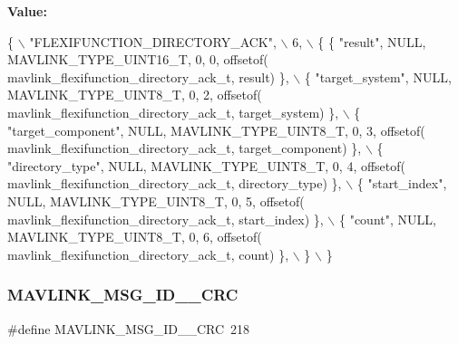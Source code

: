 {\bfseries Value\+:}
\begin{DoxyCode}
\{ \(\backslash\)
    \textcolor{stringliteral}{"FLEXIFUNCTION\_DIRECTORY\_ACK"}, \(\backslash\)
    6, \(\backslash\)
    \{  \{ \textcolor{stringliteral}{"result"}, NULL, MAVLINK_TYPE_UINT16_T, 0, 0, offsetof(
      mavlink_flexifunction_directory_ack_t, result) \}, \(\backslash\)
         \{ \textcolor{stringliteral}{"target\_system"}, NULL, MAVLINK_TYPE_UINT8_T, 0, 2, offsetof(
      mavlink_flexifunction_directory_ack_t, target\_system) \}, \(\backslash\)
         \{ \textcolor{stringliteral}{"target\_component"}, NULL, MAVLINK_TYPE_UINT8_T, 0, 3, offsetof(
      mavlink_flexifunction_directory_ack_t, target\_component) \}, \(\backslash\)
         \{ \textcolor{stringliteral}{"directory\_type"}, NULL, MAVLINK_TYPE_UINT8_T, 0, 4, offsetof(
      mavlink_flexifunction_directory_ack_t, directory\_type) \}, \(\backslash\)
         \{ \textcolor{stringliteral}{"start\_index"}, NULL, MAVLINK_TYPE_UINT8_T, 0, 5, offsetof(
      mavlink_flexifunction_directory_ack_t, start\_index) \}, \(\backslash\)
         \{ \textcolor{stringliteral}{"count"}, NULL, MAVLINK_TYPE_UINT8_T, 0, 6, offsetof(
      mavlink_flexifunction_directory_ack_t, count) \}, \(\backslash\)
         \} \(\backslash\)
\}
\end{DoxyCode}
\mbox{\label{mavlink__msg__flexifunction__directory__ack_8h_a08b4be262b1888cf915f4e29ef3e02af}} 
\subsubsection{M\+A\+V\+L\+I\+N\+K\+\_\+\+M\+S\+G\+\_\+\+I\+D\+\_\+\_\+\+C\+RC}
{\footnotesize\ttfamily \#define M\+A\+V\+L\+I\+N\+K\+\_\+\+M\+S\+G\+\_\+\+I\+D\+\_\+\_\+\+C\+RC~218}

\mbox{\label{mavlink__msg__flexifunction__directory__ack_8h_ade0f98e6a5346c2f3cbe6ed74d5bd20b}} 
